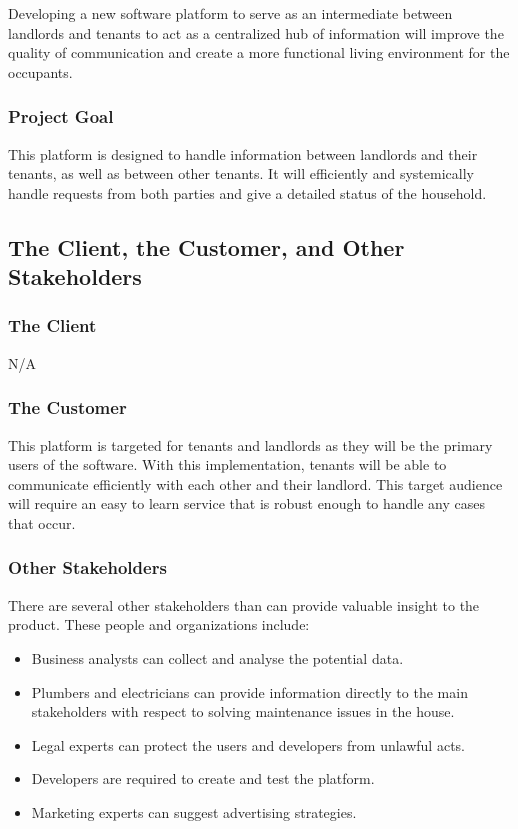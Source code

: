 \documentclass[12pt, titlepage]{article}
\begin{document}
\noindent Developing a new software platform to serve as an intermediate between 
landlords and tenants to act as a centralized hub of information will improve 
the quality of communication and create a more functional living environment 
for the occupants.

\subsubsection{Project Goal}
This platform is designed to handle information between landlords and their 
tenants, as well as between other tenants. It will efficiently and systemically 
handle requests from both parties and give a detailed status of the household.

\subsection{The Client, the Customer, and Other Stakeholders}
\subsubsection {The Client}
  N/A
\subsubsection {The Customer}
This platform is targeted for tenants and landlords as they will be the 
primary users of the software. With this implementation, tenants will be 
able to communicate efficiently with each other and their landlord. This target 
audience will require an easy to learn service that is robust enough to handle 
any cases that occur.
\subsubsection {Other Stakeholders}
There are several other stakeholders than can provide valuable insight 
to the product. These people and organizations include:
\begin{itemize}
\item Business analysts can collect and analyse the potential data.
\item Plumbers and electricians can provide information directly to the main 
stakeholders with respect to 
solving maintenance issues in the house.
\item Legal experts can protect the users and developers from unlawful acts.
\item Developers are required to create and test the platform.
\item Marketing experts can suggest advertising strategies.
\end{itemize}
\end{document}
